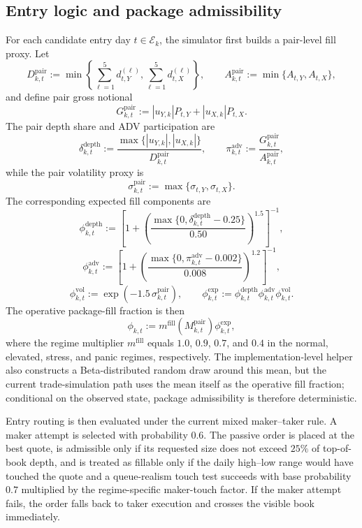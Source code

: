 \documentclass[11pt,a4paper]{article}
\begin{document}
\subsection{Entry logic and package admissibility}

For each candidate entry day \(t\in\mathcal E_k\), the simulator first builds a
pair-level fill proxy. Let
\[
  D_{k,t}^{\mathrm{pair}}
  :=
  \min\left\{
    \sum_{\ell=1}^{5} d_{t,Y}^{(\ell)},
    \sum_{\ell=1}^{5} d_{t,X}^{(\ell)}
  \right\},
  \qquad
  A_{k,t}^{\mathrm{pair}}
  :=
  \min\{A_{t,Y},A_{t,X}\},
\]
and define pair gross notional
\[
  G_{k,t}^{\mathrm{pair}}
  :=
  |u_{Y,k}|P_{t,Y} + |u_{X,k}|P_{t,X}.
\]
The pair depth share and ADV participation are
\[
  \delta_{k,t}^{\mathrm{depth}}
  :=
  \frac{\max\{|u_{Y,k}|,|u_{X,k}|\}}
       {D_{k,t}^{\mathrm{pair}}},
  \qquad
  \pi_{k,t}^{\mathrm{adv}}
  :=
  \frac{G_{k,t}^{\mathrm{pair}}}
       {A_{k,t}^{\mathrm{pair}}},
\]
while the pair volatility proxy is
\[
  \sigma_{k,t}^{\mathrm{pair}}
  :=
  \max\{\sigma_{t,Y},\sigma_{t,X}\}.
\]
The corresponding expected fill components are
\[
  \phi_{k,t}^{\mathrm{depth}}
  :=
  \left[
    1+
    \left(
      \frac{\max\{0,\delta_{k,t}^{\mathrm{depth}}-0.25\}}{0.50}
    \right)^{1.5}
  \right]^{-1},
\]
\[
  \phi_{k,t}^{\mathrm{adv}}
  :=
  \left[
    1+
    \left(
      \frac{\max\{0,\pi_{k,t}^{\mathrm{adv}}-0.002\}}{0.008}
    \right)^{1.2}
  \right]^{-1},
\]
\[
  \phi_{k,t}^{\mathrm{vol}}
  :=
  \exp\!\left(-1.5\,\sigma_{k,t}^{\mathrm{pair}}\right),
  \qquad
  \phi_{k,t}^{\mathrm{exp}}
  :=
  \phi_{k,t}^{\mathrm{depth}}
  \phi_{k,t}^{\mathrm{adv}}
  \phi_{k,t}^{\mathrm{vol}}.
\]
The operative package-fill fraction is then
\[
  \phi_{k,t}
  :=
  m^{\mathrm{fill}}(M_{k,t}^{\mathrm{pair}})
  \phi_{k,t}^{\mathrm{exp}},
\]
where the regime multiplier \(m^{\mathrm{fill}}\) equals \(1.0\), \(0.9\),
\(0.7\), and \(0.4\) in the normal, elevated, stress, and panic regimes,
respectively. The implementation-level helper also constructs a Beta-distributed
random draw around this mean, but the current trade-simulation path uses the
mean itself as the operative fill fraction; conditional on the observed state,
package admissibility is therefore deterministic.

Entry routing is then evaluated under the current mixed maker--taker rule. A
maker attempt is selected with probability \(0.6\). The passive order is placed
at the best quote, is admissible only if its requested size does not exceed
\(25\%\) of top-of-book depth, and is treated as fillable only if the daily
high--low range would have touched the quote and a queue-realism touch test
succeeds with base probability \(0.7\) multiplied by the regime-specific
maker-touch factor. If the maker attempt fails, the order falls back to taker
execution and crosses the visible book immediately.
\end{document}
